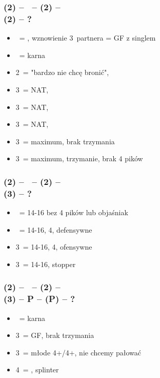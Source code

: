 \documentclass[12pt, a4paper]{article}
\begin{document}
\subsubsection*{(2\diams) -- \dbl\ -- (2\hearts) -- \dbl \\ (2\spades) -- ?}
\begin{itemize}
    \item \pass\ = \fonce, wznowienie 3\spades\ partnera = GF z singlem \spades
    \item \dbl\ = karna
    \item 2\nt\ = "bardzo nie chcę bronić", \gf
    \item 3\clubs\ = NAT, \gf
    \item 3\diams\ = NAT, \gf
    \item 3\hearts\ = NAT, \gf
    \item 3\spades\ = maximum, brak trzymania
    \item 3\nt\ = maximum, trzymanie, brak 4 pików
\end{itemize}

\subsubsection*{(2\diams) -- \dbl\ -- (2\spades) -- \dbl \\ (3\hearts) -- ?}
\begin{itemize}
    \item \pass\ = 14-16 bez 4 pików lub objaśniak \fonce
    \item \dbl\ = 14-16, 4\spades, defensywne
    \item 3\spades\ = 14-16, 4\spades, ofensywne
    \item 3\nt\ = 14-16, stopper
\end{itemize}

\subsubsection*{(2\diams) -- \dbl\ -- (2\spades) -- \dbl \\ (3\hearts) -- P -- (P) -- ?}
\begin{itemize}
    \item \dbl\ = karna
    \item 3\spades\ = GF, brak trzymania \hearts
    \item 3\nt\ = młode 4+/4+, nie chcemy pałować
    \item 4\hearts\ = \gf, splinter \hearts
\end{itemize}
\end{document}
